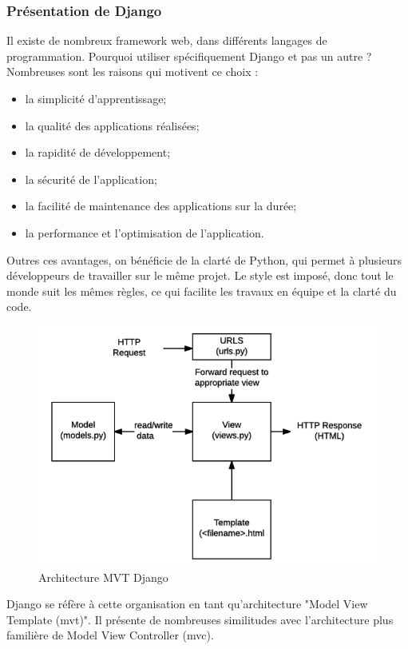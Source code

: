 	  \subsubsection{Pr\'esentation de Django}
	  Il existe de nombreux framework web, dans différents langages de programmation. Pourquoi utiliser spécifiquement Django et pas un autre ? Nombreuses sont les raisons qui motivent ce choix : 
	  \begin{itemize}
	    \item la simplicité d'apprentissage;
	    \item la qualité des applications réalisées;
	    \item la rapidité de développement;
	    \item la sécurité de l'application;
	    \item la facilité de maintenance des applications sur la durée;
	    \item la performance et l'optimisation de l'application.
	  \end{itemize}
	  Outres ces avantages, on bénéficie de la clarté de Python, qui permet à plusieurs développeurs de travailler sur le même projet. Le style est imposé, donc tout le monde suit les mêmes règles, ce qui facilite les travaux en équipe et la clarté du code.
	  \begin{figure}[H]
	      \begin{center}
		  \includegraphics[scale=0.5]{images/djangoschema.png}
	      \end{center}
	      \caption{Architecture MVT Django}
	      \label{Accueil}
	  \end{figure}
	  Django se réfère à cette organisation en tant qu’architecture "Model View Template (\gls{mvt})". Il présente de nombreuses similitudes avec l’architecture plus familière de Model View Controller (\gls{mvc}).
	  
